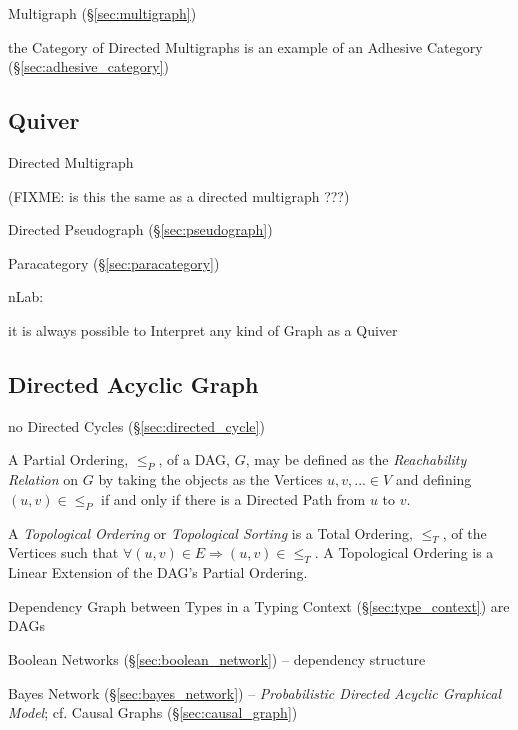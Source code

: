 Multigraph (\S\ref{sec:multigraph})

the Category of Directed Multigraphs is an example of an Adhesive Category
(\S\ref{sec:adhesive_category})



\subsection{Quiver}\label{sec:quiver}

Directed Multigraph

(FIXME: is this the same as a directed multigraph ???)

Directed Pseudograph (\S\ref{sec:pseudograph})

Paracategory (\S\ref{sec:paracategory})

nLab:

it is always possible to Interpret any kind of Graph as a Quiver



\subsection{Directed Acyclic Graph}\label{sec:dag}

no Directed Cycles (\S\ref{sec:directed_cycle})

A Partial Ordering, $\leq_P$, of a DAG, $G$, may be defined as the
\emph{Reachability Relation} on $G$ by taking the objects as the
Vertices $u,v,... \in V$ and defining $(u,v) \in \leq_P$ if and only
if there is a Directed Path from $u$ to $v$.

A \emph{Topological Ordering} or \emph{Topological Sorting} is a Total
Ordering, $\leq_T$, of the Vertices such that $\forall (u,v) \in E
\Rightarrow (u,v) \in \leq_T$. A Topological Ordering is a Linear
Extension of the DAG's Partial Ordering. %

Dependency Graph between Types in a Typing Context (\S\ref{sec:type_context})
are DAGs

\fist Boolean Networks (\S\ref{sec:boolean_network}) -- dependency structure

\fist Bayes Network (\S\ref{sec:bayes_network}) -- \emph{Probabilistic Directed
  Acyclic Graphical Model}; cf. Causal Graphs (\S\ref{sec:causal_graph})



